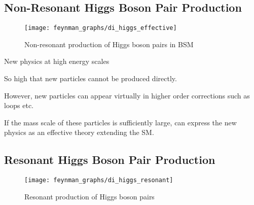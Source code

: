 \subsection{Non-Resonant Higgs Boson Pair Production}

\begin{figure}[htbp]
  \centering

  \texttt{[image: feynman\_graphs/di\_higgs\_effective]}

  \caption{Non-resonant production of Higgs boson pairs in BSM}%
  \label{fig:bsm_hh_prod_feyn}
\end{figure}



New physics at high energy scales

So high that new particles cannot be produced directly.

However, new particles can appear virtually in higher order corrections such as
loops etc.

If the mass scale of these particles is sufficiently large, can express the new
physics as an effective theory extending the SM.




\subsection{Resonant Higgs Boson Pair Production}


\begin{figure}[htbp]
  \centering

  \texttt{[image: feynman\_graphs/di\_higgs\_resonant]}

  \caption{Resonant production of Higgs boson pairs}%
  \label{fig:resonant_production_feyn}
\end{figure}








